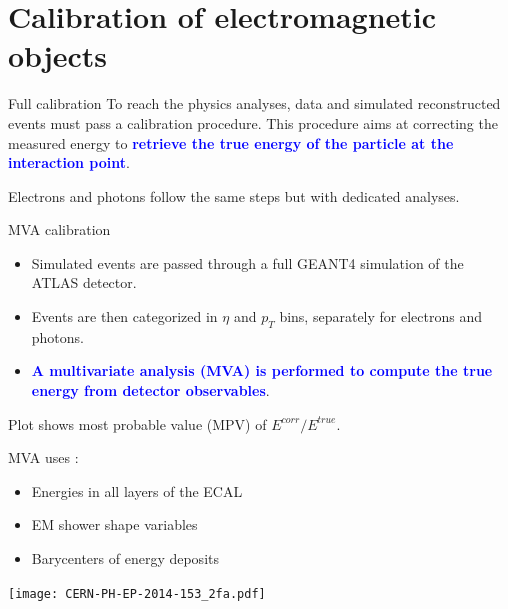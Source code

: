 \section{Calibration of electromagnetic objects}
\frame{\tableofcontents[currentsection]}
\begin{frame}{Full calibration}
  To reach the physics analyses, data and simulated reconstructed events must pass a calibration procedure.
  This procedure aims at correcting the measured energy to \textcolor{blue}{\bf retrieve the true energy of the particle at the interaction point}.
  \begin{center}
  \end{center}
  Electrons and photons follow the same steps but with dedicated analyses. 
\end{frame}
\begin{frame}{MVA calibration}
\begin{itemize}
\item Simulated events are passed through a full GEANT4 simulation of the ATLAS detector.
\item Events are then categorized in $\eta$ and $p_T$ bins, separately for electrons and photons.
\item \textcolor{blue}{\bf A multivariate analysis (MVA) is performed to compute the true energy from detector observables}.
\end{itemize}
Plot shows most probable value (MPV) of $E^{corr}/E^{true}$.
  \begin{minipage}{0.49\linewidth}
    MVA uses :
    \begin{itemize}
    \item Energies in all layers of the ECAL
    \item EM shower shape variables
    \item Barycenters of energy deposits
    \end{itemize}
  \end{minipage}
  \hfill
  \begin{minipage}{0.49\linewidth}
    \texttt{[image: CERN-PH-EP-2014-153\_2fa.pdf]}
  \end{minipage}

\end{frame}
